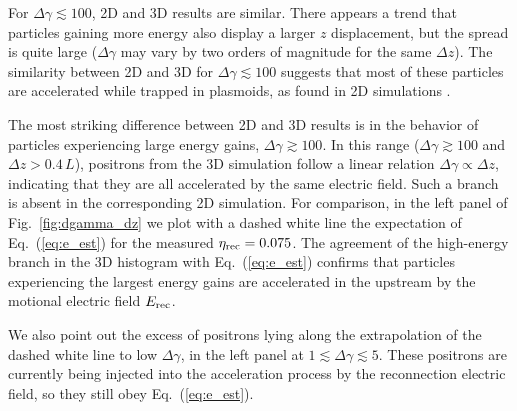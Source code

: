 \documentclass[twocolumn,twocolappendix]{aastex63}
\newcommand{\eq}[1]{Eq.~(\ref{eq:#1})}
\begin{document}
For $\Delta \gamma \lesssim 100$, 2D and 3D results are similar. There appears a trend that particles gaining more energy also display a larger $z$ displacement, but the spread is quite large ($\Delta \gamma$ may vary by two orders of magnitude for the same $\Delta z$). The similarity between 2D and 3D for $\Delta \gamma \lesssim 100$ suggests that most of these particles are accelerated while trapped in plasmoids, as found in 2D simulations \citep[][]{petropoulou_18, hakobyan_20}.

The most striking difference between 2D and 3D results is in the behavior of particles experiencing large energy gains, $\Delta \gamma \gtrsim 100$. In this range ($\Delta \gamma \gtrsim 100$ and $\Delta z > 0.4\,L$), positrons from the 3D simulation follow a linear relation  $\Delta \gamma\propto \Delta z$, indicating that they are all accelerated by the same electric field. Such a branch is absent in the corresponding 2D simulation. For comparison, in the left panel of Fig.~\ref{fig:dgamma_dz} we plot with a dashed white line the expectation of \eq{e_est} for the measured  $\eta_{\rm rec} = 0.075$. The agreement of the high-energy branch in the 3D histogram with \eq{e_est} confirms that particles experiencing the largest energy gains are accelerated in the upstream by the motional electric field $E_{\rm rec}$.

We also point out the excess of positrons lying along the extrapolation of the dashed white line to low $\Delta \gamma$, in the left panel at $1\lesssim \Delta \gamma\lesssim 5$. These positrons are currently being injected into the acceleration process by the reconnection electric field, so they still obey \eq{e_est}.


\end{document}
